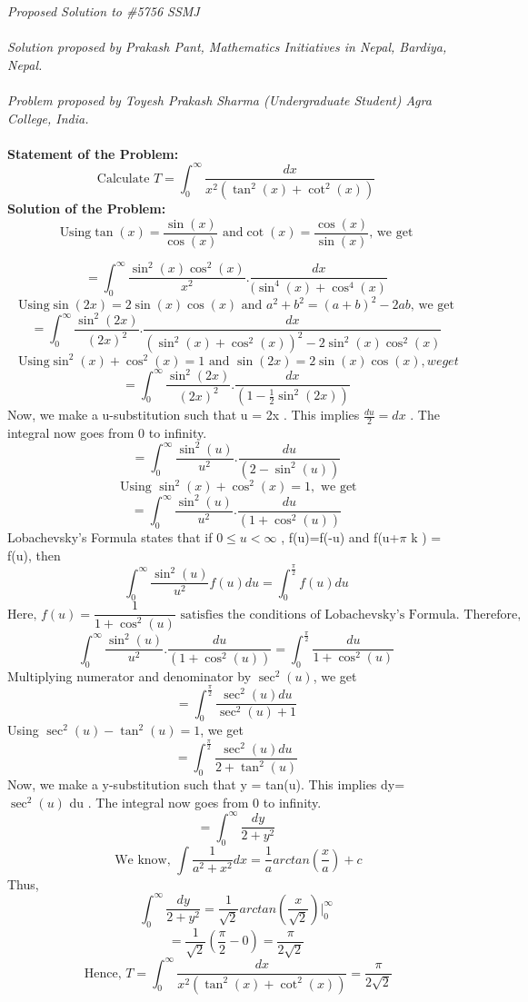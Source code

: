 \documentclass[12pt]{article}
\begin{document}
\textit{Proposed Solution to \#5756 SSMJ }\\ \\
\textit{Solution proposed by Prakash Pant, Mathematics Initiatives in Nepal, Bardiya, Nepal.}\\ \\
\textit{Problem proposed by  Toyesh Prakash Sharma (Undergraduate Student) Agra College, India.} \\ \\
\textbf{Statement of the Problem:}
\[ \text{Calculate } T = \int_0^{\infty} \frac{dx}{x^2 (\tan^2(x)+\cot^2(x))} \] 
\textbf{Solution of the Problem:}
\[ \text{ Using} \tan(x)=\frac{\sin(x)}{\cos(x)} \text{ and} \cot(x)= \frac{\cos(x)}{\sin(x)} \text{, we get } \]

\[ = \int_0^{\infty} \frac{\sin^2(x) \cos^2(x)}{x^2} . \frac{dx}{(\sin^4(x)+\cos^4(x)} \]  
\[ \text{ Using} \sin(2x) = 2 \sin(x) \cos(x) \text{ and } a^2+b^2 = (a+b)^2-2ab  \text{, we get } \]
\[ = \int_0^{\infty} \frac{\sin^2(2x)}{(2x)^2} . \frac{dx}{(\sin^2(x)+\cos^2(x))^2 - 2 \sin^2(x) \cos^2(x) } \]
\[ \text{ Using} \sin^2(x)+\cos^2(x) = 1 \text{ and } \sin(2x) = 2 \sin(x) \cos(x), we get \]
\[ = \int_0^{\infty} \frac{\sin^2(2x)}{(2x)^2} . \frac{dx}{ \left( 1- \frac{1}{2} \sin^2(2x) \right)  } \]
 Now, we make a u-substitution such that u = 2x .  This implies $\frac{du}{2}= dx $ . The integral now goes from 0 to infinity. 
\[ = \int_0^{\infty} \frac{\sin^2(u)}{u^2} . \frac{du}{ \left( 2- \sin^2(u) \right)  } \]
\[ \text{ Using } \sin^2(x)+\cos^2(x) = 1, \text{ we get}  \]
\[ = \int_0^{\infty} \frac{\sin^2(u)}{u^2} . \frac{du}{ \left( 1+ \cos^2(u) \right)  } \]
 Lobachevsky's Formula states that if $0 \le u < \infty$ , f(u)=f(-u) and f(u+$\pi$ k ) = f(u), then 
 \[ \int_0^{\infty} \frac{\sin^2(u)}{u^2} f(u) du = \int_0^{\frac{\pi}{2}} f(u) du \]
\[ \text{Here, } f(u) = \frac{1}{1+ \cos^2(u)} \text{ satisfies the conditions of Lobachevsky's Formula. Therefore, } \]
\[ \int_0^{\infty} \frac{\sin^2(u)}{u^2} . \frac{du}{ \left( 1+ \cos^2(u) \right)  } = \int_0^{\frac{\pi}{2}} \frac{du}{1+\cos^2(u)} \]
Multiplying numerator and denominator by $ \sec^2(u) $, we get 
  \[  = \int_0^{\frac{\pi}{2}} \frac{ \sec^2(u) du}{\sec^2(u)+1} \]
Using $ \sec^2(u)-\tan^2(u) = 1 $, we get 
\[  = \int_0^{\frac{\pi}{2}} \frac{ \sec^2(u) du}{2+\tan^2(u)} \]		
Now, we make a y-substitution such that y = tan(u). This implies 	dy= $\sec^2(u)$ du . The integral now goes from 0 to infinity. 
\[  = \int_0^{\infty} \frac{ dy}{2+y^2} \]	
\[ \text{ We know, } \int \frac{1}{a^2+x^2} dx = \frac{1}{a} arctan \left( \frac{x}{a} \right)+ c \]
Thus,
\[  \int_0^{\infty} \frac{ dy}{2+y^2} = \frac{1}{\sqrt{2}} arctan\left( \frac{x}{\sqrt{2}} \right) \Big| _0^{\infty} \]	
\[ = \frac{1}{\sqrt{2}} \left( \frac{\pi}{2} - 0 \right) = \frac{\pi}{2 \sqrt{2}} \]
\[ \text{ Hence, } T =\int_0^{\infty} \frac{dx}{x^2 (\tan^2(x)+\cot^2(x))} =  \frac{\pi}{2 \sqrt{2}} \]
 
\end{document}
